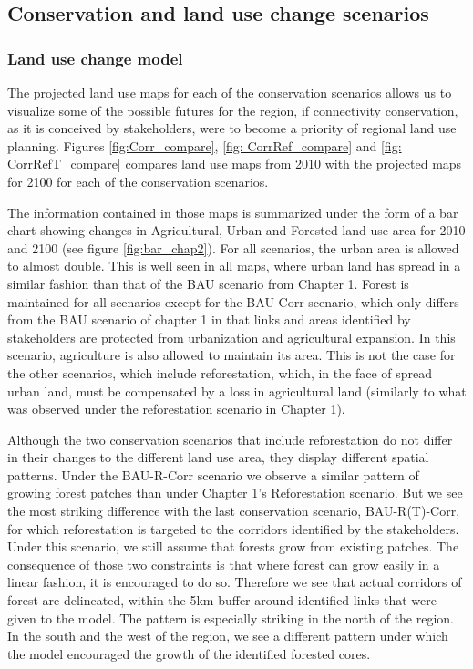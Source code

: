 \subsection{Conservation and land use change scenarios}

\subsubsection{Land use change model}

The projected land use maps for each of the conservation scenarios allows us to visualize some of the possible futures for the region, if connectivity conservation, as it is conceived by stakeholders, were to become a priority of regional land use planning. Figures \ref{fig:Corr_compare}, \ref{fig: CorrRef_compare} and \ref{fig: CorrRefT_compare} compares land use maps from 2010 with the projected maps for 2100 for each of the conservation scenarios.

The information contained in those maps is summarized under the form of a bar chart showing changes in Agricultural, Urban and Forested land use area for 2010 and 2100 (see figure \ref{fig:bar_chap2}). For all scenarios, the urban area is allowed to almost double. This is well seen in all maps, where urban land has spread in a similar fashion than that of the BAU scenario from Chapter 1. Forest is maintained for all scenarios except for the BAU-Corr scenario, which only differs from the BAU scenario of chapter 1 in that links and areas identified by stakeholders are protected from urbanization and agricultural expansion. In this scenario, agriculture is also allowed to maintain its area. This is not the case for the other scenarios, which include reforestation, which, in the face of spread urban land, must be compensated by a loss in agricultural land (similarly to what was observed under the reforestation scenario in Chapter 1).

Although the two conservation scenarios that include reforestation do not differ in their changes to the different land use area, they display different spatial patterns. Under the BAU-R-Corr scenario we observe a similar pattern of growing forest patches than under Chapter 1's Reforestation scenario. But we see the most striking difference with the last conservation scenario, BAU-R(T)-Corr, for which reforestation is targeted to the corridors identified by the stakeholders. Under this scenario, we still assume that forests grow from existing patches. The consequence of those two constraints is that where forest can grow easily in a linear fashion, it is encouraged to do so. Therefore we see that actual corridors of forest are delineated, within the 5km buffer around identified links that were given to the model. The pattern is especially striking in the north of the region. In the south and the west of the region, we see a different pattern under which the model encouraged the growth of the identified forested cores. \\

